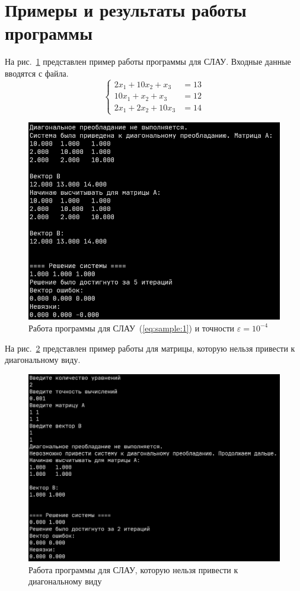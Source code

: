 \section{Примеры и результаты работы программы}
На рис.~\ref{fig:example:1} представлен пример работы программы для СЛАУ.
Входные данные вводятся с файла.
\begin{equation}
	\begin{cases}
		2 x_1 + 10 x_2 + x_3   & = 13 \\
		10 x_1 + x_2 + x_3     & = 12 \\
		2 x_1 + 2 x_2 + 10 x_3 & = 14
	\end{cases}
	\label{eq:sample:1}
\end{equation}
\begin{figure}[H]
	\includegraphics[width=\textwidth]{./img/test1.png}
	\caption{Работа программы для СЛАУ~(\ref{eq:sample:1}) и точности \(\varepsilon = 10^{-4}\)}
	\label{fig:example:1}
\end{figure}

На рис.~\ref{fig:example:2} представлен пример работы для матрицы, которую нельзя привести к
диагональному виду.
\begin{figure}[H]
	\includegraphics[width=\textwidth]{./img/test2.png}
	\caption{Работа программы для СЛАУ, которую нельзя привести к диагональному виду}
	\label{fig:example:2}
\end{figure}

